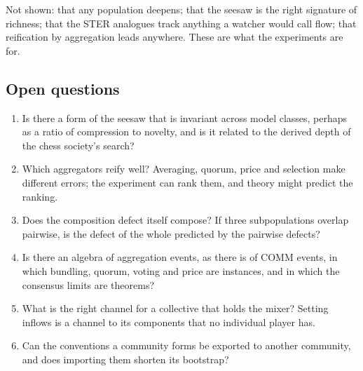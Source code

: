 \documentclass[11pt,a4paper]{article}
\begin{document}
Not shown: that any population deepens; that the seesaw is the right signature of richness; that
the STER analogues track anything a watcher would call flow; that reification by aggregation leads
anywhere. These are what the experiments are for.

\subsection{Open questions}
\begin{enumerate}[itemsep=2pt]
\item Is there a form of the seesaw that is invariant across model classes, perhaps as a ratio of
  compression to novelty, and is it related to the derived depth of the chess society's search?
\item Which aggregators reify well? Averaging, quorum, price and selection make different errors;
  the experiment can rank them, and theory might predict the ranking.
\item Does the composition defect itself compose? If three subpopulations overlap pairwise, is the
  defect of the whole predicted by the pairwise defects?
\item Is there an algebra of aggregation events, as there is of COMM events, in which bundling,
  quorum, voting and price are instances, and in which the consensus limits are theorems?
\item What is the right channel for a collective that holds the mixer? Setting inflows is a
  channel to its components that no individual player has.
\item Can the conventions a community forms be exported to another community, and does importing
  them shorten its bootstrap?
\end{enumerate}
\end{document}
